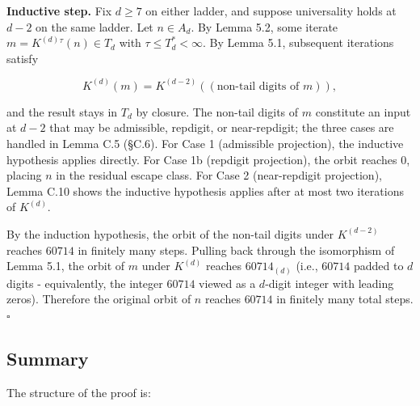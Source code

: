 \documentclass[11pt,letterpaper]{article}
\theoremstyle{paperstyle}
\theoremstyle{paperstyledef}
\theoremstyle{paperstylerem}
\begin{document}
\textbf{Inductive step.} Fix \(d \geq 7\) on either ladder, and suppose
universality holds at \(d - 2\) on the same ladder. Let \(n \in A_d\).
By Lemma 5.2, some iterate \(m = K^{(d)}{}^{\tau}(n) \in T_d\) with
\(\tau \leq T_d^* < \infty\). By Lemma 5.1, subsequent iterations
satisfy

\[K^{(d)}(m) = K^{(d-2)}((\text{non-tail digits of }m)),\]

and the result stays in \(T_d\) by closure. The non-tail digits of \(m\)
constitute an input at \(d - 2\) that may be admissible, repdigit, or
near-repdigit; the three cases are handled in Lemma C.5 (§C.6). For Case
1 (admissible projection), the inductive hypothesis applies directly.
For Case 1b (repdigit projection), the orbit reaches \(0\), placing
\(n\) in the residual escape class. For Case 2 (near-repdigit
projection), Lemma C.10 shows the inductive hypothesis applies after at
most two iterations of \(K^{(d)}\).

By the induction hypothesis, the orbit of the non-tail digits under
\(K^{(d-2)}\) reaches \(60714\) in finitely many steps. Pulling back
through the isomorphism of Lemma 5.1, the orbit of \(m\) under
\(K^{(d)}\) reaches \(60714_{(d)}\) (i.e., \(60714\) padded to \(d\)
digits - equivalently, the integer \(60714\) viewed as a \(d\)-digit
integer with leading zeros). Therefore the original orbit of \(n\)
reaches \(60714\) in finitely many total steps. \(\square\)

\hypertarget{summary-1}{%
\subsection{Summary}\label{summary-1}}

The structure of the proof is:
\end{document}
